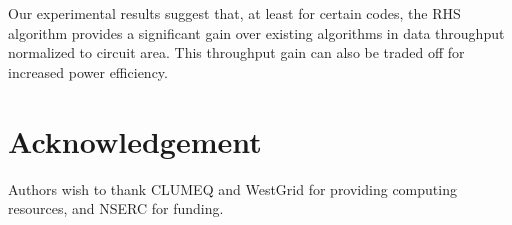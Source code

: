 \documentclass[12pt,journal,twoside,draftcls,onecolumn]{IEEEtran}
\begin{document}
Our experimental results suggest that, at least for certain codes, the RHS algorithm provides a significant gain over existing algorithms in data throughput normalized to circuit area. This throughput gain can also be traded off for increased power efficiency.

\section*{Acknowledgement}
Authors wish to thank CLUMEQ and WestGrid for providing computing resources, and NSERC for funding. 

\ifCLASSOPTIONcaptionsoff
  \newpage
\fi









\end{document}
